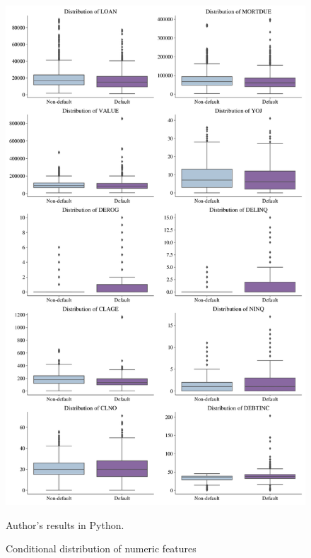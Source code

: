 \begin{figure}[H]
    \begin{center}
    \caption{Conditional distribution of numeric features}
    \label{fig:boxfeat}
    \includegraphics[width=140mm]{Figures/Continuous_Features_Distribution_Boxplots.jpg}
\end{center}
\begin{center}
    \begin{source}Author's results in Python.\end{source}
    \end{center}
\end{figure}

